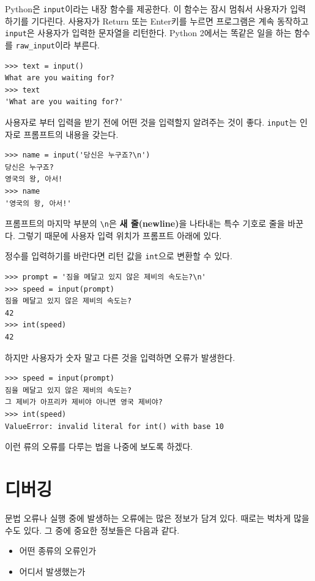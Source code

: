 \documentclass[10pt]{book}
\begin{document}
Python은 {\tt input}이라는 내장 함수를 제공한다.  이 함수는 잠시 멈춰서
사용자가 입력하기를 기다린다.  사용자가 {\sf Return} 또는 {\sf
  Enter}키를 누르면 프로그램은 계속 동작하고 \verb"input"은 사용자가
입력한 문자열을 리턴한다.  Python 2에서는 똑같은 일을 하는 함수를
\verb"raw_input"이라 부른다.


\begin{verbatim}
>>> text = input()
What are you waiting for?
>>> text
'What are you waiting for?'
\end{verbatim}
%
사용자로 부터 입력을 받기 전에 어떤 것을 입력할지 알려주는 것이 좋다.
\verb"input"는 인자로 프롬프트의 내용을 갖는다.

\begin{verbatim}
>>> name = input('당신은 누구죠?\n')
당신은 누구죠?
영국의 왕, 아서!
>>> name
'영국의 왕, 아서!'
\end{verbatim}
%
프롬프트의 마지막 부분의 \verb"\n"은 {\bf 새 줄(newline)}을 나타내는
특수 기호로 줄을 바꾼다. 그렇기 때문에 사용자 입력 위치가 프롬프트 아래에 있다. 

정수를 입력하기를 바란다면 리턴 값을 {\tt int}으로 변환할 수 있다. 

\begin{verbatim}
>>> prompt = '짐을 메달고 있지 않은 제비의 속도는?\n'
>>> speed = input(prompt)
짐을 메달고 있지 않은 제비의 속도는?
42
>>> int(speed)
42
\end{verbatim}
%
하지만 사용자가 숫자 말고 다른 것을 입력하면 오류가 발생한다. 

\begin{verbatim}
>>> speed = input(prompt)
짐을 메달고 있지 않은 제비의 속도는?
그 제비가 아프리카 제비야 아니면 영국 제비야?
>>> int(speed)
ValueError: invalid literal for int() with base 10
\end{verbatim}
%
이런 류의 오류를 다루는 법을 나중에 보도록 하겠다. 


\section{디버깅}
\label{whitespace}

문법 오류나 실행 중에 발생하는 오류에는 많은 정보가 담겨 있다.  때로는
벅차게 많을 수도 있다.  그 중에 중요한 정보들은 다음과 같다. 


\begin{itemize}

\item 어떤 종류의 오류인가

\item 어디서 발생했는가

\end{itemize}
\end{document}
